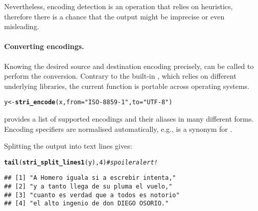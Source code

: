 \documentclass[nojss]{jss}\usepackage[]{graphicx}\usepackage[]{xcolor}
\makeatletter
\newcommand{\hlnum}[1]{\textcolor[rgb]{0.686,0.059,0.569}{#1}}%
\newcommand{\hlstr}[1]{\textcolor[rgb]{0.192,0.494,0.8}{#1}}%
\newcommand{\hlcom}[1]{\textcolor[rgb]{0.678,0.584,0.686}{\textit{#1}}}%
\newcommand{\hlstd}[1]{\textcolor[rgb]{0.345,0.345,0.345}{#1}}%
\newcommand{\hlkwb}[1]{\textcolor[rgb]{0.69,0.353,0.396}{#1}}%
\newcommand{\hlkwc}[1]{\textcolor[rgb]{0.333,0.667,0.333}{#1}}%
\newcommand{\hlkwd}[1]{\textcolor[rgb]{0.737,0.353,0.396}{\textbf{#1}}}%
\newenvironment{kframe}{%
 \def\at@end@of@kframe{}%
 \ifinner\ifhmode%
  \def\at@end@of@kframe{\end{minipage}}%
  \begin{minipage}{\columnwidth}%
 \fi\fi%
 \def\FrameCommand##1{\hskip\@totalleftmargin \hskip-\fboxsep
 \colorbox{shadecolor}{##1}\hskip-\fboxsep
     \hskip-\linewidth \hskip-\@totalleftmargin \hskip\columnwidth}%
 \MakeFramed {\advance\hsize-\width
   \@totalleftmargin\z@ \linewidth\hsize
   \@setminipage}}%
 {\par\unskip\endMakeFramed%
 \at@end@of@kframe}
\newenvironment{knitrout}{}{} %
\makeatother
\begin{document}
\noindent
Nevertheless, encoding detection is an operation that relies on heuristics,
therefore there is a  chance that the output might be imprecise or even
misleading.




\paragraph{Converting encodings.}
Knowing the desired source and destination encoding precisely,
 can be called to perform the conversion.
Contrary to the built-in , which relies
on different underlying libraries, the current function is portable
across operating systems.


\begin{knitrout}
\color{fgcolor}\begin{kframe}
\begin{alltt}
\hlstd{y} \hlkwb{<-} \hlkwd{stri_encode}\hlstd{(x,} \hlkwc{from}\hlstd{=}\hlstr{"ISO-8859-1"}\hlstd{,} \hlkwc{to}\hlstd{=}\hlstr{"UTF-8"}\hlstd{)}
\end{alltt}
\end{kframe}
\end{knitrout}

  provides a list of
supported encodings and their aliases in many different forms.
Encoding specifiers are normalised automatically, e.g.,
 is a synonym for .


Splitting the output  into text lines gives:

\begin{knitrout}
\color{fgcolor}\begin{kframe}
\begin{alltt}
\hlkwd{tail}\hlstd{(}\hlkwd{stri_split_lines1}\hlstd{(y),} \hlnum{4}\hlstd{)}  \hlcom{# spoiler alert!}
\end{alltt}
\begin{verbatim}
## [1] "A Homero iguala si a escrebir intenta," 
## [2] "y a tanto llega de su pluma el vuelo,"  
## [3] "cuanto es verdad que a todos es notorio"
## [4] "el alto ingenio de don DIEGO OSORIO."
\end{verbatim}
\end{kframe}
\end{knitrout}
\end{document}
